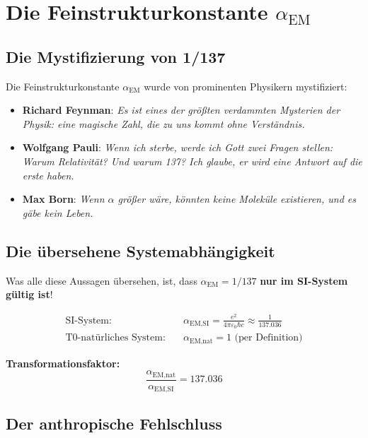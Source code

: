 \documentclass[12pt,a4paper]{article}
\newcommand{\epsilonzero}{\varepsilon_0}
\newcommand{\pichar}{\pi}
\newcommand{\alphaEMSI}{\alpha_{\text{EM,SI}}}
\newcommand{\alphaEMnat}{\alpha_{\text{EM,nat}}}
\begin{document}
	
	\section{Die Feinstrukturkonstante $\alpha_{\text{EM}}$}
	\label{sec:alpha_em}
	
	\subsection{Die Mystifizierung von 1/137}
	\label{subsec:alpha_mystifizierung}
	
	Die Feinstrukturkonstante $\alpha_{\text{EM}}$ wurde von prominenten Physikern mystifiziert:
	
	\begin{itemize}
		\item \textbf{Richard Feynman}: \textit{Es ist eines der größten verdammten Mysterien der Physik: eine magische Zahl, die zu uns kommt ohne Verständnis.}
		\item \textbf{Wolfgang Pauli}: \textit{Wenn ich sterbe, werde ich Gott zwei Fragen stellen: Warum Relativität? Und warum 137? Ich glaube, er wird eine Antwort auf die erste haben.}
		\item \textbf{Max Born}: \textit{Wenn $\alpha$ größer wäre, könnten keine Moleküle existieren, und es gäbe kein Leben.}
	\end{itemize}
	
	\subsection{Die übersehene Systemabhängigkeit}
	\label{subsec:alpha_systemabhaengigkeit}
	
	Was alle diese Aussagen übersehen, ist, dass $\alpha_{\text{EM}} = 1/137$ \textbf{nur im SI-System gültig ist}!
	
	\begin{align}
		\text{SI-System:} \quad &\alphaEMSI = \frac{e^2}{4\pichar\epsilonzero\hbar c} \approx \frac{1}{137.036} \\
		\text{T0-natürliches System:} \quad &\alphaEMnat = 1 \text{ (per Definition)}
	\end{align}
	
	\textbf{Transformationsfaktor:}
	$$\frac{\alphaEMnat}{\alphaEMSI} = 137.036$$
	
	\subsection{Der anthropische Fehlschluss}
	\label{subsec:anthropischer_fehlschluss}
	
\end{document}
